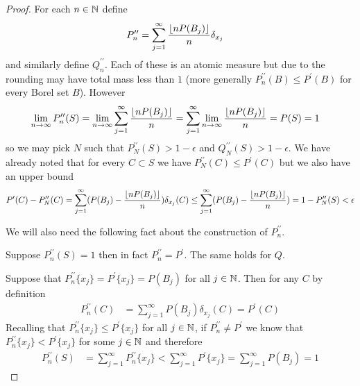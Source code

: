 \begin{proof}
For each $n \in \mathbb{N}$ define 
\begin{align*}
P^{\prime \prime}_n &=  \sum_{j=1}^\infty \frac{\left \lfloor nP(B_j) \right \rfloor}{n} \delta_{x_j}
\end{align*}
and similarly define $Q^{\prime \prime}_n$.  Each of these is an atomic measure but due to the rounding may have total mass less than $1$ (more generally $P^{\prime \prime}_n(B) \leq P^{\prime}(B)$ for every Borel set $B$).  However 
\begin{align*}
\lim_{n \to \infty} P^{\prime \prime}_n (S) &= \lim_{n \to \infty} \sum_{j=1}^\infty  \frac{\left \lfloor nP(B_j) \right \rfloor}{n} = \sum_{j=1}^\infty  \lim_{n \to \infty} \frac{\left \lfloor nP(B_j) \right \rfloor}{n} = P(S) = 1
\end{align*}
so we may pick $N$ such that $P^{\prime \prime}_N (S) > 1 - \epsilon$ and $Q^{\prime \prime}_N (S) > 1 - \epsilon$.  We have already noted that for every $C \subset S$ 
we have $P^{\prime \prime}_N (C) \leq  P^\prime(C)$ but we also have an upper bound
\begin{align}\label{StrassenPlus:Ineq3}
P^\prime(C)  - P^{\prime \prime}_N (C) 
= \sum_{j=1}^\infty (P(B_j) - \frac{\left \lfloor nP(B_j) \right \rfloor}{n}) \delta_{x_j}(C) 
\leq \sum_{j=1}^\infty (P(B_j) - \frac{\left \lfloor nP(B_j) \right \rfloor}{n}) 
= 1 - P^{\prime \prime}_N (S) < \epsilon
\end{align}

We will also need the following fact about the construction of $P^{\prime \prime}_n$.
\begin{clm}\label{StrassenPlus:ExactApproximation}Suppose $P^{\prime \prime}_n(S) = 1$ then in fact $P^{\prime \prime}_n = P^\prime$.  The same holds for $Q$.
\end{clm}
Suppose that $P^{\prime \prime}_n \lbrace x_j \rbrace = P^\prime \lbrace x_j \rbrace = P(B_j)$ for all $j \in \mathbb{N}$.  Then for any $C$ by definition 
\begin{align*}
P^{\prime \prime}_n (C) &= \sum_{j=1}^\infty P(B_j) \delta_{x_j}(C) = P^\prime(C)
\end{align*}
Recalling that $P^{\prime \prime}_n \lbrace x_j \rbrace \leq P^\prime \lbrace x_j \rbrace$ for all $j \in \mathbb{N}$,  if $P^{\prime \prime}_n \neq P^\prime$ we know that $P^{\prime \prime}_n \lbrace x_j \rbrace < P^\prime \lbrace x_j \rbrace$ for some $j \in \mathbb{N}$ and therefore 
\begin{align*}
P^{\prime \prime}_n (S) &= \sum_{j=1}^\infty P^{\prime \prime}_n \lbrace x_j \rbrace < \sum_{j=1}^\infty  P^\prime \lbrace x_j \rbrace =  \sum_{j=1}^\infty  P(B_j) = 1
\end{align*}


\end{proof}

